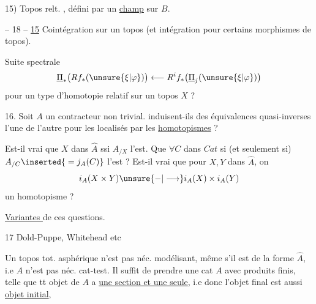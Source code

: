 15) Topos relt. , défini par un \uline{champ} sur $B$.

-- 18 --
\uline{15} Cointégration sur un topos (et intégration pour certains morphismes de topos).

Suite spectrale
\[
\underline\Pi_*\bigl(Rf_*(\unsure{\xi|\varphi})\bigr)
\longleftarrow R^if_*\bigl(\underline\Pi_j(\unsure{\xi|\varphi})\bigr)
\]
pour un type d'homotopie relatif sur un topos $X$ ?


16. Soit $A$ un contracteur non trivial. 
induisent-ils des équivalences quasi-inverses l'une de l'autre pour les localisés par les \uline{homotopismes} ?

Est-il vrai que $X$ dans $\widehat A$  ssi $A_{/X}$ l'est. Que $\forall C$ dans $Cat$  si (et seulement si) $A_{/C}\inserted{{}=j_A(C)}$ l'est ? Est-il vrai que pour $X,Y$ dans $\widehat A$, on
\[
i_A(X\times Y)\unsure{\mathbin{-}|\longrightarrow}i_A(X)\times i_A(Y)
\]
un homotopisme ?

\uline{Variantes } de ces questions.


17 Dold-Puppe, Whitehead etc

Un topos  tot. asphérique n'est pas néc. modélisant, même s'il est de la forme $\widehat A$, i.e $A$ n'est pas néc. cat-test.  Il suffit de prendre une cat $A$ avec  produits finis, telle que tt objet de $A$ a \uline{une section et une seule}, i.e donc l'objet final est aussi \uline{objet initial},


